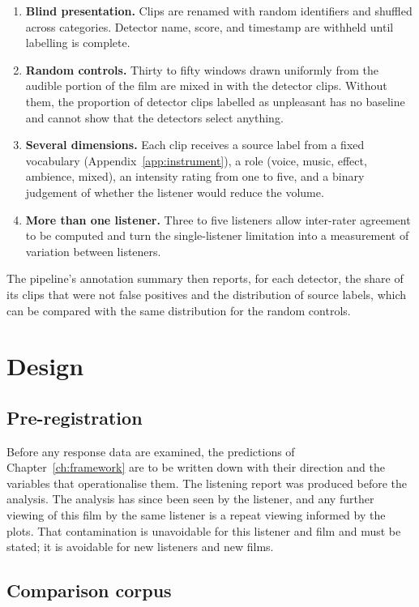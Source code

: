 \begin{enumerate}
\item \textbf{Blind presentation.} Clips are renamed with random identifiers and shuffled across categories. Detector name, score, and timestamp are withheld until labelling is complete.
\item \textbf{Random controls.} Thirty to fifty windows drawn uniformly from the audible portion of the film are mixed in with the detector clips. Without them, the proportion of detector clips labelled as unpleasant has no baseline and cannot show that the detectors select anything.
\item \textbf{Several dimensions.} Each clip receives a source label from a fixed vocabulary (Appendix~\ref{app:instrument}), a role (voice, music, effect, ambience, mixed), an intensity rating from one to five, and a binary judgement of whether the listener would reduce the volume.
\item \textbf{More than one listener.} Three to five listeners allow inter-rater agreement to be computed and turn the single-listener limitation into a measurement of variation between listeners.
\end{enumerate}

The pipeline's annotation summary then reports, for each detector, the share of its clips that were not false positives and the distribution of source labels, which can be compared with the same distribution for the random controls.

\section{Design}

\subsection{Pre-registration}

Before any response data are examined, the predictions of Chapter~\ref{ch:framework} are to be written down with their direction and the variables that operationalise them. The listening report was produced before the analysis. The analysis has since been seen by the listener, and any further viewing of this film by the same listener is a repeat viewing informed by the plots. That contamination is unavoidable for this listener and film and must be stated; it is avoidable for new listeners and new films.

\subsection{Comparison corpus}

